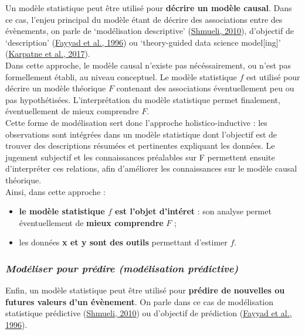 \documentclass[12pt,twoside]{reedthesis}
\providecommand{\tightlist}{%
  \setlength{\itemsep}{0pt}\setlength{\parskip}{0pt}}
\begin{document}
Un modèle statistique peut être utilisé pour \textbf{décrire un modèle causal}. Dans ce cas, l'enjeu principal du modèle étant de décrire des associations entre des évènements, on parle de `modélisation descriptive' (\protect\hyperlink{ref-shmueli_explain_2010}{Shmueli, 2010}), d'objectif de `description' (\protect\hyperlink{ref-fayyad_data_nodate}{Fayyad et al., 1996}) ou `theory-guided data science model{[}ing{]}' (\protect\hyperlink{ref-karpatne_theory-guided_2017}{Karpatne et al., 2017}).\\

Dans cette approche, le modèle causal n'existe pas nécéssairement, ou n'est pas formellement établi, au niveau conceptuel. Le modèle statistique \(f\) est utilisé pour décrire un modèle théorique \(F\) contenant des associations éventuellement peu ou pas hypothétisées. L'interprétation du modèle statistique permet finalement, éventuellement de mieux comprendre \(F\).\\

Cette forme de modélisation sert donc l'approche holistico-inductive : les observations sont intégrées dans un modèle statistique dont l'objectif est de trouver des descriptions résumées et pertinentes expliquant les données. Le jugement subjectif et les connaissances préalables sur F permettent ensuite d'interpréter ces relations, afin d'améliorer les connaissances sur le modèle causal théorique.\\

Ainsi, dans cette approche :
\begin{itemize}
\tightlist
\item
  \textbf{le modèle statistique \(f\) est l'objet d'intéret} : son analyse permet éventuellement de \textbf{mieux comprendre} \(F\) ;
\item
  les données \textbf{x et y sont des outils} permettant d'estimer \(f\).
\end{itemize}
\hypertarget{moduxe9liser-pour-pruxe9dire-moduxe9lisation-pruxe9dictive}{%
\subsubsection{\texorpdfstring{\textbf{\emph{Modéliser pour prédire (modélisation prédictive)}}}{Modéliser pour prédire (modélisation prédictive)}}\label{moduxe9liser-pour-pruxe9dire-moduxe9lisation-pruxe9dictive}}

Enfin, un modèle statistique peut être utilisé pour \textbf{prédire de nouvelles ou futures valeurs d'un évènement}. On parle dans ce cas de modélisation statistique prédictive (\protect\hyperlink{ref-shmueli_explain_2010}{Shmueli, 2010}) ou d'objectif de prédiction (\protect\hyperlink{ref-fayyad_data_nodate}{Fayyad et al., 1996}).\\
\end{document}
